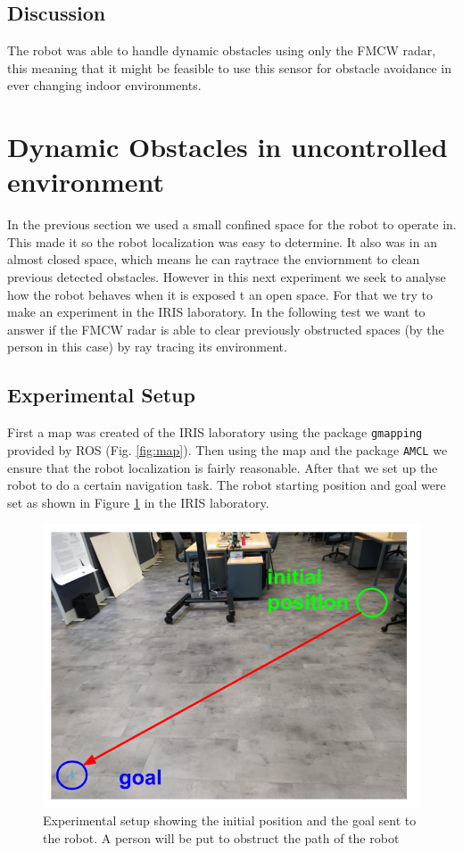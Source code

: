 \subsection{Discussion}
The robot was able to handle dynamic obstacles using only the \ac{FMCW} \ac{radar}, this meaning that it might be feasible to use this sensor for obstacle avoidance in ever changing indoor environments.

\section {Dynamic Obstacles in uncontrolled environment}
In the previous section we used a small confined space for the robot to operate in. This made it so the robot localization was easy to determine. It also was in an almost closed space, which means he can raytrace the enviornment to clean previous detected obstacles. However in this next experiment we seek to analyse how the robot behaves when it is exposed t an open space. For that we try to make an experiment in the \ac{IRIS} laboratory.
In the following test we want to answer  if the \ac{FMCW} \ac{radar} is  able to clear previously obstructed spaces (by the person in this case) by ray tracing its environment. 
\subsection{Experimental Setup}
First a map was created of the \ac{IRIS} laboratory using the package \texttt{gmapping} provided by \ac{ROS} (Fig. \ref{fig:map}). Then using the map and the package \texttt{\ac{AMCL}} we ensure that the robot localization is fairly reasonable. After that we set up the robot to do a certain navigation task.
The robot starting position and goal were set as shown in Figure \ref{fig:setup} in the \ac{IRIS} laboratory. 

\begin{figure}[ht!]
\centerline{\includegraphics [width=0.8 \textwidth]{imgs/chapter5/setup.png}}
\caption[Experimental setup]{Experimental setup showing the initial position and the goal sent to the robot. A person will be put to obstruct the path of the robot}
\label{fig:setup}
\end{figure}


